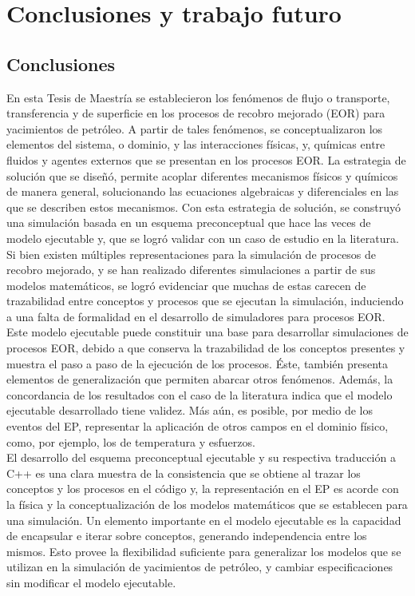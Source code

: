 \chapter{Conclusiones y trabajo futuro}\label{cap:Conclusiones}
\section{Conclusiones}


En esta Tesis de Maestría se establecieron los fenómenos de flujo o transporte, transferencia y de superficie en los procesos de recobro mejorado (EOR) para yacimientos de petróleo. A partir de tales fenómenos, se conceptualizaron los elementos del sistema, o dominio, y las interacciones físicas, y, químicas entre fluidos y agentes externos que se presentan en los procesos EOR. La estrategia de solución que se diseñó, permite acoplar diferentes mecanismos físicos y químicos de manera general, solucionando las ecuaciones algebraicas y diferenciales en las que se describen estos mecanismos. Con esta estrategia de solución, se construyó una simulación basada en un esquema preconceptual que hace las veces de modelo ejecutable y, que se logró validar con un caso de estudio en la literatura.\\

Si bien existen múltiples representaciones para la simulación de procesos de recobro mejorado, y se han realizado diferentes simulaciones a partir de sus modelos matemáticos, se logró evidenciar que muchas de estas carecen de trazabilidad entre conceptos y procesos que se ejecutan la simulación, induciendo a una falta de formalidad en el desarrollo de simuladores para procesos EOR. Este modelo ejecutable puede constituir una base para desarrollar simulaciones de procesos EOR, debido a que conserva la trazabilidad de los conceptos presentes y muestra el paso a paso de la ejecución de los procesos. Éste, también presenta elementos de generalización que permiten abarcar otros fenómenos. Además, la concordancia de los resultados con el caso de la literatura indica que el modelo ejecutable desarrollado tiene validez. Más aún, es posible, por medio de los eventos del EP, representar la aplicación de otros campos en el dominio físico, como, por ejemplo, los de temperatura y esfuerzos.\\

El desarrollo del esquema preconceptual ejecutable y su respectiva traducción a C++ es una clara muestra de la consistencia que se obtiene al trazar los conceptos y los procesos en el código y, la representación en el EP es acorde con la física y la conceptualización de los modelos matemáticos que se establecen para una simulación. Un elemento importante en el modelo ejecutable es la capacidad de encapsular e iterar sobre conceptos, generando independencia entre los mismos. Esto provee la flexibilidad suficiente para generalizar los modelos que se utilizan en la simulación de yacimientos de petróleo, y cambiar especificaciones sin modificar el modelo ejecutable.

